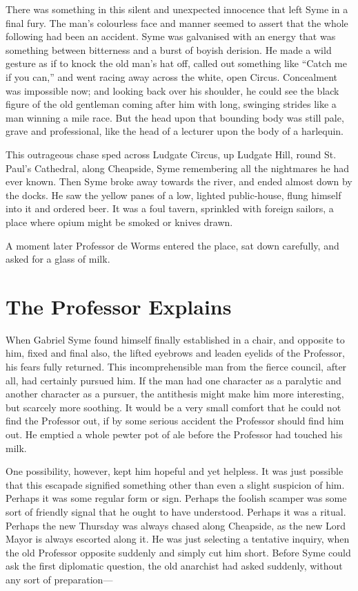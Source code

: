 \documentclass{book}
\begin{document}
There was something in this silent and unexpected innocence that left Syme in a final fury. The man’s colourless face and manner seemed to assert that the whole following had been an accident. Syme was galvanised with an energy that was something between bitterness and a burst of boyish derision. He made a wild gesture as if to knock the old man’s hat off, called out something like “Catch me if you can,” and went racing away across the white, open Circus. Concealment was impossible now; and looking back over his shoulder, he could see the black figure of the old gentleman coming after him with long, swinging strides like a man winning a mile race. But the head upon that bounding body was still pale, grave and professional, like the head of a lecturer upon the body of a harlequin.

This outrageous chase sped across Ludgate Circus, up Ludgate Hill, round St. Paul’s Cathedral, along Cheapside, Syme remembering all the nightmares he had ever known. Then Syme broke away towards the river, and ended almost down by the docks. He saw the yellow panes of a low, lighted public-house, flung himself into it and ordered beer. It was a foul tavern, sprinkled with foreign sailors, a place where opium might be smoked or knives drawn.

A moment later Professor de Worms entered the place, sat down carefully, and asked for a glass of milk.

\chapter{The Professor Explains}
\label{chapter-7}
When Gabriel Syme found himself finally established in a chair, and opposite to him, fixed and final also, the lifted eyebrows and leaden eyelids of the Professor, his fears fully returned. This incomprehensible man from the fierce council, after all, had certainly pursued him. If the man had one character as a paralytic and another character as a pursuer, the antithesis might make him more interesting, but scarcely more soothing. It would be a very small comfort that he could not find the Professor out, if by some serious accident the Professor should find him out. He emptied a whole pewter pot of ale before the Professor had touched his milk.

One possibility, however, kept him hopeful and yet helpless. It was just possible that this escapade signified something other than even a slight suspicion of him. Perhaps it was some regular form or sign. Perhaps the foolish scamper was some sort of friendly signal that he ought to have understood. Perhaps it was a ritual. Perhaps the new Thursday was always chased along Cheapside, as the new Lord Mayor is always escorted along it. He was just selecting a tentative inquiry, when the old Professor opposite suddenly and simply cut him short. Before Syme could ask the first diplomatic question, the old anarchist had asked suddenly, without any sort of preparation—
\end{document}
